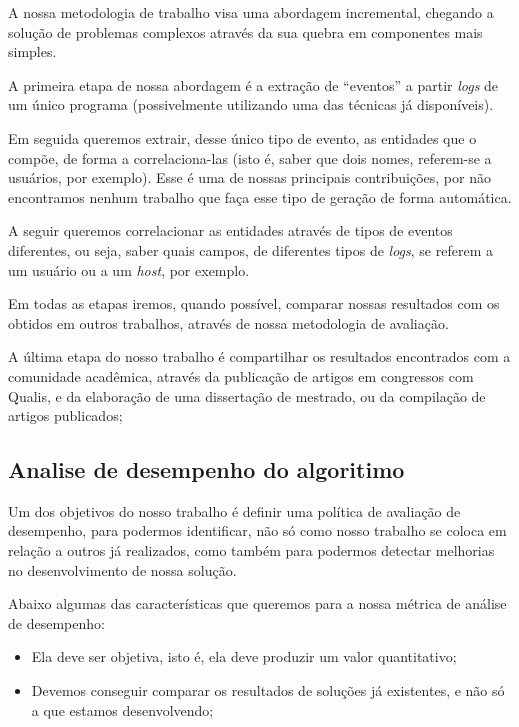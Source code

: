 \documentclass[
	12pt,				%
	openright,			%
	twoside,			%
	a4paper,			%
	english,			%
	spanish,			%
	brazil,				%
	]{abntex2}
\begin{document}
A nossa metodologia de trabalho visa uma abordagem incremental, chegando a solução de problemas complexos através da sua quebra em componentes mais simples.

A primeira etapa de nossa abordagem é a extração de ``eventos'' a partir \emph{logs} de um único programa (possivelmente utilizando uma das técnicas já disponíveis).

Em seguida queremos extrair, desse único tipo de evento, as entidades que o compõe, de forma a correlaciona-las (isto é, saber que dois nomes, referem-se a usuários, por exemplo). Esse é uma de nossas principais contribuições, por não encontramos nenhum trabalho que faça esse tipo de geração de forma automática.

A seguir queremos correlacionar as entidades através de tipos de eventos diferentes, ou seja, saber quais campos, de diferentes tipos de \emph{logs}, se referem a um usuário ou a um \emph{host}, por exemplo.

Em todas as etapas iremos, quando possível, comparar nossas resultados com os obtidos em outros trabalhos, através de nossa metodologia de avaliação.

A última etapa do nosso trabalho é compartilhar os resultados encontrados com a comunidade acadêmica, através da publicação de artigos em congressos com Qualis, e  da elaboração de uma dissertação de mestrado, ou da compilação de artigos publicados;

\subsection{Analise de desempenho do algoritimo}

Um dos objetivos do nosso trabalho é definir uma política de avaliação de desempenho, para podermos identificar, não só como nosso trabalho se coloca em relação a outros já realizados, como também para podermos detectar melhorias no desenvolvimento de nossa solução.

Abaixo algumas das características que queremos para a nossa métrica de análise de desempenho:

\begin{itemize}
	\item Ela deve ser objetiva, isto é, ela deve produzir um valor quantitativo;
	\item Devemos conseguir comparar os resultados de soluções já existentes, e não só a que estamos desenvolvendo;
\end{itemize}
\end{document}
